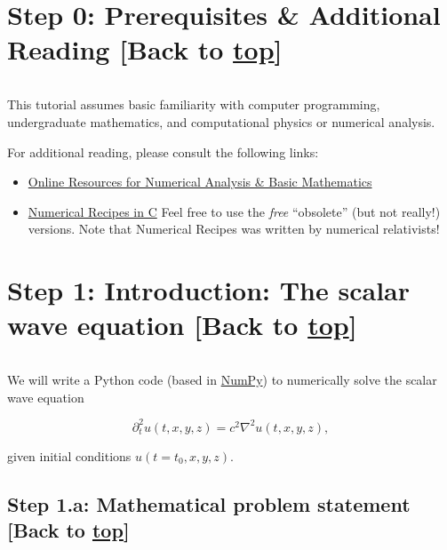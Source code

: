\documentclass[landscape,letterpaper,10pt,english]{article}
\providecommand{\tightlist}{%
      \setlength{\itemsep}{0pt}\setlength{\parskip}{0pt}}
\begin{document}
    \hypertarget{step-0-prerequisites-additional-reading-back-to-top}{%
\section{\texorpdfstring{Step 0: Prerequisites \& Additional Reading
{[}Back to
\hyperref[toc]{top}{]}}{Step 0: Prerequisites \& Additional Reading {[}Back to {]}}}\label{step-0-prerequisites-additional-reading-back-to-top}}

\[\label{prereqs}\]

This tutorial assumes basic familiarity with computer programming,
undergraduate mathematics, and computational physics or numerical
analysis.

For additional reading, please consult the following links:

\begin{itemize}
\tightlist
\item
  \href{https://etienneresearch.com/MATH521-f2018/notes__additional_reading.html}{Online
  Resources for Numerical Analysis \& Basic Mathematics}
\item
  \href{http://www.numerical.recipes/}{Numerical Recipes in C} Feel free
  to use the \emph{free} ``obsolete'' (but not really!) versions. Note
  that Numerical Recipes was written by numerical relativists!
\end{itemize}

    \hypertarget{step-1-introduction-the-scalar-wave-equation-back-to-top}{%
\section{\texorpdfstring{Step 1: Introduction: The scalar wave equation
{[}Back to
\hyperref[toc]{top}{]}}{Step 1: Introduction: The scalar wave equation {[}Back to {]}}}\label{step-1-introduction-the-scalar-wave-equation-back-to-top}}

\[\label{intro}\]

We will write a Python code (based in \href{https://numpy.org/}{NumPy})
to numerically solve the scalar wave equation

\[\partial_t^2 u(t,x,y,z) = c^2 \nabla^2 u(t,x,y,z),\]

given initial conditions \(u(t=t_0,x,y,z)\).

\hypertarget{step-1.a-mathematical-problem-statement-back-to-top}{%
\subsection{\texorpdfstring{Step 1.a: Mathematical problem statement
{[}Back to
\hyperref[toc]{top}{]}}{Step 1.a: Mathematical problem statement {[}Back to {]}}}\label{step-1.a-mathematical-problem-statement-back-to-top}}
\end{document}

